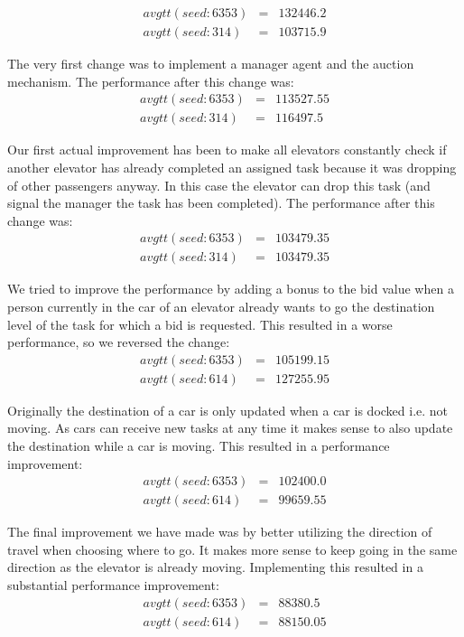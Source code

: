 \documentclass[a4paper,11pt]{article}
\begin{document}
\[\begin{array}{lcl}
avgtt (seed: 6353) & = & 132446.2\\
avgtt (seed: 314) & = & 103715.9
\end{array}\]

The very first change was to implement a manager agent and the auction mechanism. The performance after this change was:
\[\begin{array}{lcl}
avgtt (seed: 6353) & = & 113527.55\\
avgtt (seed: 314) & = & 116497.5
\end{array}\]


Our first actual improvement has been to make all elevators constantly check if another elevator has already completed an assigned task because it was dropping of other passengers anyway. In this case the elevator can drop this task (and signal the manager the task has been completed). The performance after this change was:
\[\begin{array}{lcl}
avgtt (seed: 6353) & = & 103479.35\\
avgtt (seed: 314) & = & 103479.35
\end{array}\]

We tried to improve the performance by adding a bonus to the bid value when a person currently in the car of an elevator already wants to go the destination level of the task for which a bid is requested. This resulted in a worse performance, so we reversed the change:
\[\begin{array}{lcl}
avgtt (seed: 6353) & = & 105199.15\\
avgtt (seed: 614) & = & 127255.95
\end{array}\]

Originally the destination of a car is only updated when a car is docked i.e. not moving. As cars can receive new tasks at any time it makes sense to also update the destination while a car is moving. This resulted in a performance improvement: 
\[\begin{array}{lcl}
avgtt (seed: 6353) & = & 102400.0\\
avgtt (seed: 614) & = & 99659.55
\end{array}\]

The final improvement we have made was by better utilizing the direction of travel when choosing where to go. It makes more sense to keep going in the same direction as the elevator is already moving. Implementing this resulted in a substantial performance improvement:
\[\begin{array}{lcl}
avgtt (seed: 6353) & = & 88380.5\\
avgtt (seed: 614) & = & 88150.05
\end{array}\]
\end{document}
